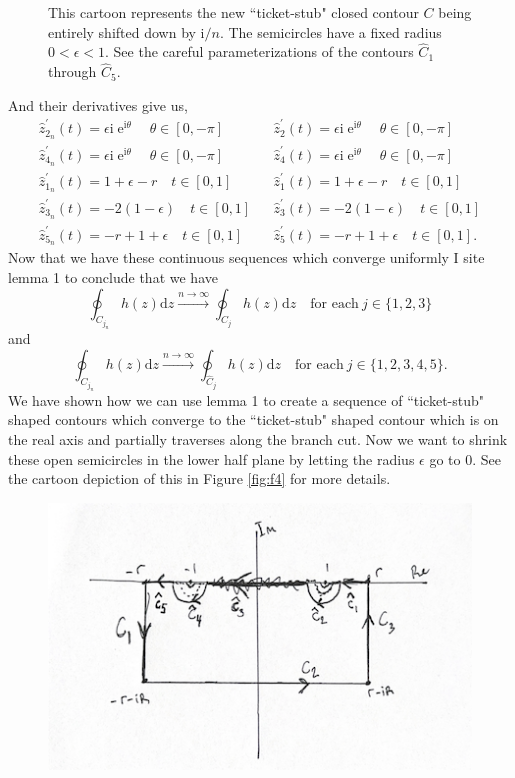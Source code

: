 \documentclass[10pt]{amsart}
\newcommand{\D}{\mathrm{d}}
\newcommand{\I}{\mathrm{i}}
\DeclareMathOperator{\E}{e}
\theoremstyle{nonumberplain}
\begin{document}
\begin{enumerate}[label={\bf {\arabic*}:}]
\begin{itemize}
\begin{figure}[h]
	\caption{
		This cartoon represents the new ``ticket-stub" closed contour $C$ being entirely shifted down by $\I / n$.
		The semicircles have a fixed radius $0< \epsilon < 1$.
		See the careful parameterizations of the contours $\widehat C_1$ through $\widehat C_5$.
	}\label{fig:f3}
\end{figure}
And their derivatives give us,
\begin{align*}
&\hat z_{2_n}^\prime(t) = \epsilon \I \E^{\I \theta} \quad \theta \in [0, -\pi]&
	&\hat z_2^\prime(t) = \epsilon \I \E^{\I \theta} \quad \theta \in [0, -\pi]& \\
&\hat z_{4_n}^\prime(t) = \epsilon \I \E^{\I \theta} \quad \theta \in [0, -\pi]&
	&\hat z_4^\prime(t) = \epsilon \I \E^{\I \theta} \quad \theta \in [0, -\pi]& \\
&\hat z_{1_n}^\prime(t) = 1 + \epsilon - r \quad t \in [0, 1]&
	&\hat z_1^\prime(t) = 1 + \epsilon - r \quad t \in [0, 1]& \\
&\hat z_{3_n}^\prime(t) = - 2(1 - \epsilon) \quad t \in [0, 1]&
	&\hat z_3^\prime(t) = - 2(1 - \epsilon) \quad t \in [0, 1]& \\
&\hat z_{5_n}^\prime(t) = - r + 1 + \epsilon \quad t \in [0, 1]&
	&\hat z_5^\prime(t) = - r + 1 + \epsilon \quad t \in [0, 1].&
\end{align*}
Now that we have these continuous sequences which converge uniformly I site lemma 1 to conclude that we have
$$
\oint_{C_{j_n}}h(z)\D z \overset{n\rightarrow \infty}{\longrightarrow} \oint_{C_j} h(z)\D z \quad \text{for each} \: j \in \{1, 2, 3\}
$$
and
$$
\oint_{\widehat C_{j_n}}h(z)\D z \overset{n\rightarrow \infty}{\longrightarrow} \oint_{\widehat C_j} h(z)\D z \quad \text{for each} \: j \in \{1, 2, 3, 4, 5\}.
$$
We have shown how we can use lemma 1 to create a sequence of ``ticket-stub" shaped contours which converge to the ``ticket-stub" shaped contour which is on the real axis and partially traverses along the branch cut.
Now we want to shrink these open semicircles in the lower half plane by letting the radius $\epsilon$ go to 0.
See the cartoon depiction of this in Figure \ref{fig:f4} for more details.
\begin{figure}[h]
	\centering
	\includegraphics{five-part-two-contour}

\end{figure}
\end{itemize}
\end{enumerate}
\end{document}
